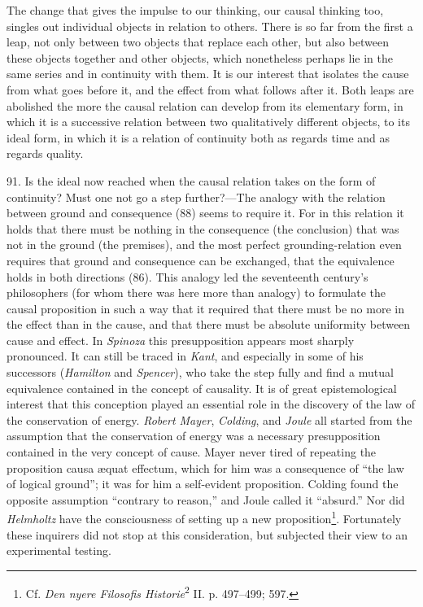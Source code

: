 \documentclass[12pt,a4paper]{book}
\newcommand{\opage}[1]{\marginnote{\footnotesize\textit{[#1]}}}
\begin{document}
The change that gives the impulse to our thinking, our causal thinking too,
singles out individual objects in relation to others. There is so far from the
first a leap, not only between two objects that replace each other, but also
\opage{213}between these objects together and other objects, which nonetheless perhaps
lie in the same series and in continuity with them. It is our interest that
isolates the cause from what goes before it, and the effect from what follows
after it. Both leaps are abolished the more the causal relation can develop
from its elementary form, in which it is a successive relation between two
qualitatively different objects, to its ideal form, in which it is a relation
of continuity both as regards time and as regards quality.

91. Is the ideal now reached when the causal relation takes on the form of
continuity? Must one not go a step further?---The analogy with the relation
between ground and consequence (88) seems to require it. For in this relation
it holds that there must be nothing in the consequence (the conclusion) that
was not in the ground (the premises), and the most perfect grounding-relation
even requires that ground and consequence can be exchanged, that the
equivalence holds in both directions (86). This analogy led the seventeenth
century's philosophers (for whom there was here more than analogy) to
formulate the causal proposition in such a way that it required that there
must be no more in the effect than in the cause, and that there must be absolute
uniformity between cause and effect. In \emph{Spinoza} this presupposition
appears most sharply pronounced. It can still be traced in \emph{Kant}, and
especially in some of his successors (\emph{Hamilton} and \emph{Spencer}),
who take the step fully and find a mutual equivalence contained in the concept
of causality. It is of great epistemological interest that this conception
played an essential role in the discovery of the law of the conservation of
energy. \emph{Robert Mayer}, \emph{Colding}, and \emph{Joule} all started from
the assumption that the conservation of energy was a necessary presupposition
contained in the very concept of cause. Mayer never tired of repeating the
proposition causa æquat effectum, which for him was a consequence of ``the law
of logical ground''; it was for him a self-evident proposition. Colding found
the opposite assumption ``contrary to reason,'' and Joule called it
``absurd.'' Nor did \emph{Helmholtz} \opage{214}have the consciousness of setting up a
new proposition\footnote{Cf. \emph{Den nyere Filosofis
Historie}\textsuperscript{2} II. p. 497--499; 597.}. Fortunately these
inquirers did not stop at this consideration, but subjected their view to an
experimental testing.
\end{document}
